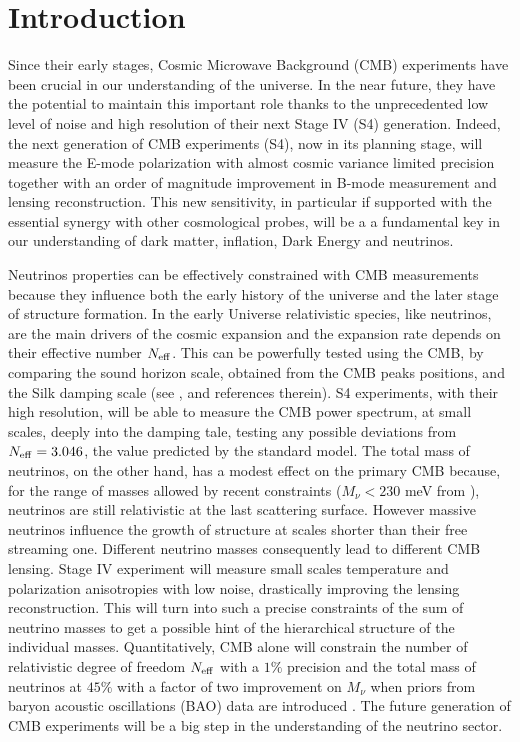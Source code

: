 \documentclass[aps,prd,reprint,superscriptaddress]{revtex4-1}
\begin{document}
\section{Introduction}\label{sec:intro}
Since their early stages, Cosmic Microwave Background (CMB) experiments have been crucial in our understanding of the universe. In the near future, they have the potential to maintain this important role  thanks to the unprecedented low level of noise and high resolution of their next Stage IV (S4) generation. 
Indeed, the next generation of CMB experiments (S4), now in its planning stage, will measure the E-mode polarization with almost cosmic variance limited precision together with an order of magnitude improvement in B-mode measurement and lensing reconstruction.
This new sensitivity, in particular if supported with the essential synergy with other cosmological probes, will be a a fundamental key in our understanding of dark matter, inflation, Dark Energy and neutrinos. 

Neutrinos properties can be effectively constrained with CMB measurements because they influence both the early history of the universe and the later stage of structure formation. 
In the early Universe relativistic species, like neutrinos, are the main drivers of the cosmic expansion and the expansion rate depends on their effective number $N_{\rm eff}$. This can be powerfully tested using the CMB, by comparing the sound horizon scale, obtained from the CMB peaks positions, and the Silk damping scale (see \cite{2013arXiv1309.5383A}, \cite{2013PhRvD..87h3008H} and references therein). 
S4 experiments, with their high resolution, will be able to measure the CMB power spectrum, at small scales, deeply into the damping tale, testing any possible deviations from $N_{\rm eff}=3.046$, the value predicted by the standard model.
The total mass of neutrinos, on the other hand, has a modest effect on the primary CMB because, for the range of masses allowed by recent constraints ($M_{\nu}<230$ meV from \cite{2014A&A...571A..16P}), neutrinos are still relativistic at the last scattering surface. However massive neutrinos influence the growth of structure at scales shorter than their free streaming one. Different neutrino masses consequently lead to different CMB lensing. Stage IV experiment will measure small scales temperature and polarization anisotropies with low noise, drastically improving the lensing reconstruction. This will turn into such a precise constraints of the sum of neutrino masses to get a possible hint of the hierarchical structure of the individual masses. 
Quantitatively, CMB alone will constrain the number of relativistic degree of freedom $N_{\rm eff}$ with a $1\%$ precision and the total mass of neutrinos at $45\%$ with a factor of two improvement on $M_{\nu}$ when priors from baryon acoustic oscillations (BAO) data are introduced \cite{wu:2014}. The future generation of CMB experiments will be a big step in the understanding of the neutrino sector.
\end{document}
